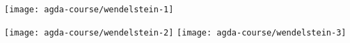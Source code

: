 \documentclass[12pt,utf8,notheorems,compress,t]{beamer}
\begin{document}
\newcommand{\imgslide}[1]{{\usebackgroundtemplate{\parbox[c][\paperheight][c]{\paperwidth}{\centering\texttt{[image: \#1]}}}\begin{frame}[plain]\end{frame}}}

\imgslide{announcement-agda-workshop/catarina-coquand}
\imgslide{announcement-agda-workshop/martin-escardo}
\imgslide{announcement-agda-workshop/pc2018}
\imgslide{announcement-agda-workshop/fischbachau}

\begin{frame}[plain]
  \centering
  \medskip

  \texttt{[image: agda-course/wendelstein-1]}

  \texttt{[image: agda-course/wendelstein-2]}
  \texttt{[image: agda-course/wendelstein-3]}
\end{frame}

\imgslide{agda-course/agda-wiki}
\end{document}
